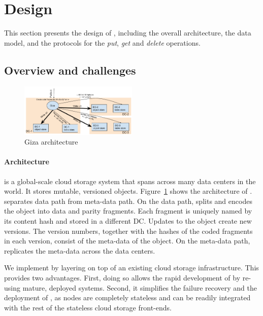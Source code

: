 
\section{Design}

This section presents the design of {\name}, including the overall architecture,
the data model, and the protocols for the {\em put}, {\em get} and {\em delete} operations.

\subsection{Overview and challenges}

\begin{figure}[tp]
\centering
\includegraphics[width=0.5\textwidth]{fig/Giza}
\caption{Giza architecture\label{fig:arch}}
\end{figure}

\paragraph{Architecture}
{\name} is a global-scale cloud storage system 
that spans across many data centers in the world.
It stores mutable, versioned objects.
Figure~\ref{fig:arch} shows the architecture of \name. 
\name separates data path from meta-data path.
On the data path, \name splits and encodes the object into data and parity fragments.
Each fragment is uniquely named by its content hash
and stored in a different DC.
Updates to the object create new versions.
The version numbers, together with the hashes of the coded fragments in each version,
consist of the meta-data of the object.
On the meta-data path, \name replicates the meta-data across the data centers.

We implement \name by layering on top of an existing cloud storage infrastructure. This 
provides two advantages.  First, doing so allows the rapid development of \name by re-using 
mature, deployed systems.  Second, it simplifies the failure recovery and 
the deployment of \name, as \name nodes are completely stateless and can be
readily integrated with the rest of the stateless cloud storage front-ends.

